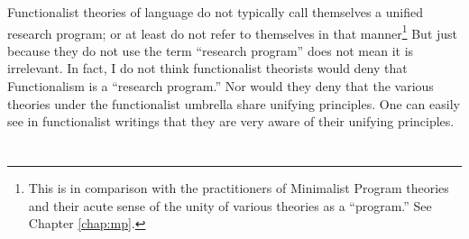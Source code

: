 

Functionalist theories of language do not typically call themselves a unified research program; or at least do not refer to themselves in that manner\footnote{This is in comparison with the practitioners of Minimalist Program theories and their acute sense of the unity of various theories as a ``program.'' See Chapter \ref{chap:mp}.} But just because they do not use the term ``research program'' does not mean it is irrelevant. In fact, I do not think functionalist theorists would deny that Functionalism is a ``research program.'' Nor would they deny that the various theories under the functionalist umbrella share unifying principles. One can easily see in functionalist writings that they are very aware of their unifying principles.

\section{}
\section{}
\section{}






